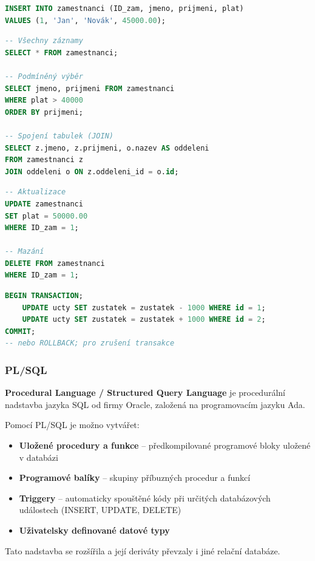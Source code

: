 \documentclass[12pt,a4paper]{article}
\begin{document}
\begin{lstlisting}[language=SQL, caption=Vložení dat]
INSERT INTO zamestnanci (ID_zam, jmeno, prijmeni, plat)
VALUES (1, 'Jan', 'Novák', 45000.00);
\end{lstlisting}

\begin{lstlisting}[language=SQL, caption=Výběr dat]
-- Všechny záznamy
SELECT * FROM zamestnanci;

-- Podmíněný výběr
SELECT jmeno, prijmeni FROM zamestnanci
WHERE plat > 40000
ORDER BY prijmeni;

-- Spojení tabulek (JOIN)
SELECT z.jmeno, z.prijmeni, o.nazev AS oddeleni
FROM zamestnanci z
JOIN oddeleni o ON z.oddeleni_id = o.id;
\end{lstlisting}

\begin{lstlisting}[language=SQL, caption=Aktualizace a mazání dat]
-- Aktualizace
UPDATE zamestnanci
SET plat = 50000.00
WHERE ID_zam = 1;

-- Mazání
DELETE FROM zamestnanci
WHERE ID_zam = 1;
\end{lstlisting}

\begin{lstlisting}[language=SQL, caption=Transakce]
BEGIN TRANSACTION;
    UPDATE ucty SET zustatek = zustatek - 1000 WHERE id = 1;
    UPDATE ucty SET zustatek = zustatek + 1000 WHERE id = 2;
COMMIT;
-- nebo ROLLBACK; pro zrušení transakce
\end{lstlisting}

\subsubsection{PL/SQL}

\textbf{Procedural Language / Structured Query Language} je procedurální nadstavba jazyka SQL od
firmy Oracle, založená na programovacím jazyku Ada.

Pomocí PL/SQL je možno vytvářet:
\begin{itemize}
  \item \textbf{Uložené procedury a funkce} -- předkompilované programové bloky uložené v databázi
  \item \textbf{Programové balíky} -- skupiny příbuzných procedur a funkcí
  \item \textbf{Triggery} -- automaticky spouštěné kódy při určitých databázových událostech
    (INSERT, UPDATE, DELETE)
  \item \textbf{Uživatelsky definované datové typy}
\end{itemize}
Tato nadstavba se rozšířila a její deriváty převzaly i jiné relační databáze.
\end{document}
